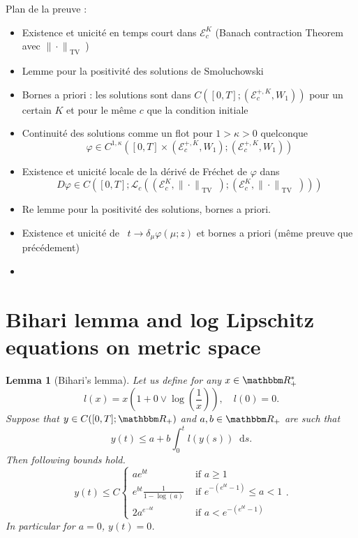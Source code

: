 \documentclass[a4paper,11pt, reqno]{amsart}
\newcommand{\cE}{\mathcal{E}}	\newcommand{\EE}{\mathbbm{E}}
\newcommand{\cL}{\mathcal{L}}	\newcommand{\LL}{\mathbbm{L}}
\newcommand{\dd}{\mathop{}\!\mathrm{d}}
\newcommand{\red}[1]{{\color{red} #1}}
\newcommand{\1}{\mathbbm{1}}
\theoremstyle{plain}
\newtheorem{lemma}[theorem]{Lemma}
\theoremstyle{definition}
\begin{document}
\red{
Plan de la preuve :
\begin{itemize}
  \item Existence et unicit{\'e} en temps court dans $\cE^K_c$ (Banach
  contraction Theorem avec $\| \cdot \|_{ \text{ TV } }$)
  
  \item Lemme pour la positivit{\'e} des solutions de Smoluchowski
  
  \item Bornes a priori : les solutions sont dans $C ([0, T] ;
  (\cE^{+, K}_c, W_1))$ pour un certain $K$ et pour le m{\^e}me $c$
  que la condition initiale
  
  \item Continuit{\'e} des solutions comme un flot pour $1 > \kappa > 0$
  quelconque
  \[ \varphi \in C^{1, \kappa} ([0, T] \times (\cE^{+, K}_c, W_1) ;
     (\cE^{+, K}_c, W_1)) \]
  \item Existence et unicit{\'e} locale de la d{\'e}riv{\'e} de Fr{\'e}chet de
  $\varphi$ dans
  \[ D \varphi \in C ([0, T] ; \cL_c ((\cE^K_c, \| \cdot
     \|_{ \text{ TV } }) ; (\cE^K_c, \| \cdot \|_{ \text{ TV } }))) \]
  \item Re lemme pour la positivit{\'e} des solutions, bornes a priori.
  
  \item Existence et unicit{\'e} de \ $t \rightarrow \delta_{\mu} \varphi (\mu
  ; z)$ et bornes a priori (m{\^e}me preuve que pr{\'e}c{\'e}dement)
  
  \item 
\end{itemize}
}

\section{Bihari lemma and log Lipschitz equations on metric space}

\begin{lemma}[Bihari's lemma]
  Let us define for any $x \in \RR_+^{\ast}$
  \[ l (x) = x \left( 1 + 0 \vee \log \left( \frac{1}{x} \right) \right),
     \quad l (0) = 0. \]
  Suppose that $y \in C ([0, T] ; \RR_+)$ and $a, b \in \RR_+$
  are such that
  \[ y (t) \le a + b \int_0^t l (y (s)) \dd s. \]
  Then following bounds hold.
  \[ y (t) \le C \left\{\begin{array}{ll}
       a e^{b t} &  \text{ if } a \ge 1\\
       e^{b t} \frac{1}{1 - \log (a)} &  \text{ if } e^{- (e^{b t} - 1)}
       \le a < 1\\
       2 a^{e^{- b t}} &  \text{ if } a < e^{- (e^{b t} - 1)}
     \end{array}\right. . \]
  In particular for $a = 0 $, $y (t) = 0$. 
\end{lemma}
\end{document}
